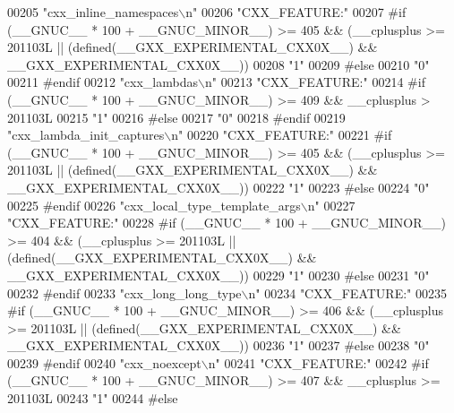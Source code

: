\begin{DoxyCode}
00205 \textcolor{stringliteral}{"cxx\_inline\_namespaces\(\backslash\)n"}
00206 \textcolor{stringliteral}{"CXX\_FEATURE:"}
00207 \textcolor{preprocessor}{#if (\_\_GNUC\_\_ * 100 + \_\_GNUC\_MINOR\_\_) >= 405 && (\_\_cplusplus >= 201103L ||
       (defined(\_\_GXX\_EXPERIMENTAL\_CXX0X\_\_) && \_\_GXX\_EXPERIMENTAL\_CXX0X\_\_))}
00208 \textcolor{stringliteral}{"1"}
00209 \textcolor{preprocessor}{#else}
00210 \textcolor{stringliteral}{"0"}
00211 \textcolor{preprocessor}{#endif}
00212 \textcolor{stringliteral}{"cxx\_lambdas\(\backslash\)n"}
00213 \textcolor{stringliteral}{"CXX\_FEATURE:"}
00214 \textcolor{preprocessor}{#if (\_\_GNUC\_\_ * 100 + \_\_GNUC\_MINOR\_\_) >= 409 && \_\_cplusplus > 201103L}
00215 \textcolor{stringliteral}{"1"}
00216 \textcolor{preprocessor}{#else}
00217 \textcolor{stringliteral}{"0"}
00218 \textcolor{preprocessor}{#endif}
00219 \textcolor{stringliteral}{"cxx\_lambda\_init\_captures\(\backslash\)n"}
00220 \textcolor{stringliteral}{"CXX\_FEATURE:"}
00221 \textcolor{preprocessor}{#if (\_\_GNUC\_\_ * 100 + \_\_GNUC\_MINOR\_\_) >= 405 && (\_\_cplusplus >= 201103L ||
       (defined(\_\_GXX\_EXPERIMENTAL\_CXX0X\_\_) && \_\_GXX\_EXPERIMENTAL\_CXX0X\_\_))}
00222 \textcolor{stringliteral}{"1"}
00223 \textcolor{preprocessor}{#else}
00224 \textcolor{stringliteral}{"0"}
00225 \textcolor{preprocessor}{#endif}
00226 \textcolor{stringliteral}{"cxx\_local\_type\_template\_args\(\backslash\)n"}
00227 \textcolor{stringliteral}{"CXX\_FEATURE:"}
00228 \textcolor{preprocessor}{#if (\_\_GNUC\_\_ * 100 + \_\_GNUC\_MINOR\_\_) >= 404 && (\_\_cplusplus >= 201103L ||
       (defined(\_\_GXX\_EXPERIMENTAL\_CXX0X\_\_) && \_\_GXX\_EXPERIMENTAL\_CXX0X\_\_))}
00229 \textcolor{stringliteral}{"1"}
00230 \textcolor{preprocessor}{#else}
00231 \textcolor{stringliteral}{"0"}
00232 \textcolor{preprocessor}{#endif}
00233 \textcolor{stringliteral}{"cxx\_long\_long\_type\(\backslash\)n"}
00234 \textcolor{stringliteral}{"CXX\_FEATURE:"}
00235 \textcolor{preprocessor}{#if (\_\_GNUC\_\_ * 100 + \_\_GNUC\_MINOR\_\_) >= 406 && (\_\_cplusplus >= 201103L ||
       (defined(\_\_GXX\_EXPERIMENTAL\_CXX0X\_\_) && \_\_GXX\_EXPERIMENTAL\_CXX0X\_\_))}
00236 \textcolor{stringliteral}{"1"}
00237 \textcolor{preprocessor}{#else}
00238 \textcolor{stringliteral}{"0"}
00239 \textcolor{preprocessor}{#endif}
00240 \textcolor{stringliteral}{"cxx\_noexcept\(\backslash\)n"}
00241 \textcolor{stringliteral}{"CXX\_FEATURE:"}
00242 \textcolor{preprocessor}{#if (\_\_GNUC\_\_ * 100 + \_\_GNUC\_MINOR\_\_) >= 407 && \_\_cplusplus >= 201103L}
00243 \textcolor{stringliteral}{"1"}
00244 \textcolor{preprocessor}{#else}

\end{DoxyCode}
